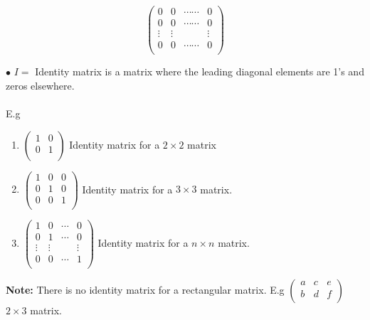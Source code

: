 \documentclass[11pt,a4paper]{article}
\begin{document}
\[
\begin{pmatrix}
0 & 0 & \cdots \cdots & 0\\
0 & 0 & \cdots \cdots & 0\\
\vdots & \vdots && \vdots \\
0 & 0 & \cdots \cdots & 0\\
\end{pmatrix}
\]

\vspace{0.2cm}

$\bullet $ $I =$ Identity matrix is a matrix where the leading diagonal elements are 1's and zeros elsewhere.\\\\ 
E.g
\begin{enumerate}

\item[] $
\begin{pmatrix}
1&0\\
0&1\\
\end{pmatrix}
$ Identity matrix for a $2\times 2$ matrix\\

\item[]
$
\begin{pmatrix}
1 & 0 & 0\\
0 & 1 & 0\\
0 & 0 & 1\\
\end{pmatrix}
$ Identity matrix for a $3\times 3$ matrix.\\

\item[]
$
\begin{pmatrix}
1 & 0 & \cdots & 0\\
0 & 1 & \cdots & 0\\
\vdots & \vdots && \vdots \\
0 & 0 & \cdots & 1\\
\end{pmatrix}
$ Identity matrix for a $n\times n$ matrix.\\
\end{enumerate}

\textbf{Note:} There is no identity matrix for a  rectangular matrix. E.g 
$
\begin{pmatrix}
a & c & e\\
b & d & f\\
\end{pmatrix}
$ $2\times 3$ matrix.\\
\end{document}
